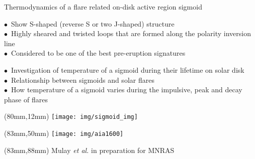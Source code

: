 \documentclass{beamer}
\begin{document}
\begin{frame}{\normalsize Thermodynamics of a flare related
on-disk active region sigmoid}

\vspace{-10mm}

 \begin{tcolorbox}[title=Sigmoids, width=72mm, left=1mm, beforeafter skip=5mm, beforeafter = 10mm, right = 1mm]
\scriptsize  $\bullet$~Show S-shaped (reverse S or two J-shaped) structure \\
             $\bullet$~Highly sheared and twisted loops that are formed along
the polarity inversion line \\
             $\bullet$~Considered to be one of the best pre-eruption signatures
\end{tcolorbox}

\begin{tcolorbox}[title=Research objective, width=72mm, left=1mm, beforeafter skip=1mm, beforeafter = 10mm, right = 1mm]
\scriptsize  $\bullet$~Investigation of temperature of a sigmoid during their
lifetime on solar disk \\
             $\bullet$~Relationship between sigmoids and solar flares \\
             $\bullet$~How temperature of a sigmoid varies during the
impulsive, peak and decay phase of flares
\end{tcolorbox}

\begin{textblock*}{30mm}(80mm,12mm)
\texttt{[image: img/sigmoid\_img]}
\end{textblock*}
\begin{textblock*}{30mm}(83mm,50mm)
\texttt{[image: img/aia1600]}
\end{textblock*}


\begin{textblock*}{40mm}(83mm,88mm)
\tiny Mulay \textit{et al.} in preparation for MNRAS
 \end{textblock*}

\end{frame}

\end{document}
